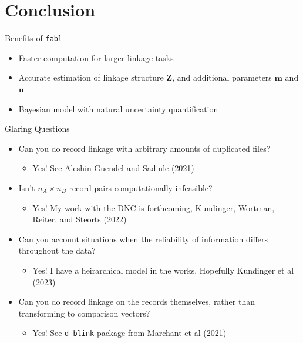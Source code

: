 \documentclass{beamer}
\begin{document}
\section{Conclusion}

\begin{frame}{Benefits of \texttt{fabl}}
	\begin{itemize}
		\item Faster computation for larger linkage tasks
		
		\item Accurate estimation of linkage structure $\mathbf{Z}$, and additional parameters $\mathbf{m}$ and $\mathbf{u}$
		
		\item Bayesian model with natural uncertainty quantification
	\end{itemize}
\end{frame}

\begin{frame}{Glaring Questions}
	\begin{itemize}
		\item Can you do record linkage with arbitrary amounts of duplicated files?
		\begin{itemize}
			\item<2-> Yes! See Aleshin-Guendel and Sadinle (2021)
		\end{itemize}
		
		\item Isn't $n_A \times n_B$ record pairs computationally infeasible?
		\begin{itemize}
			\item<3-> Yes! My work with the DNC is forthcoming, Kundinger, Wortman, Reiter, and Steorts (2022)
		\end{itemize}
		
		\item Can you account situations when the reliability of information differs throughout the data?
		\begin{itemize}
			\item<4-> Yes! I have a heirarchical model in the works. Hopefully Kundinger et al (2023)
		\end{itemize}
		
		\item Can you do record linkage on the records themselves, rather than transforming to comparison vectors?
		\begin{itemize}
			\item<5-> Yes! See \texttt{d-blink} package from Marchant et al (2021)
		\end{itemize}
		
	\end{itemize}
\end{frame}
\end{document}

